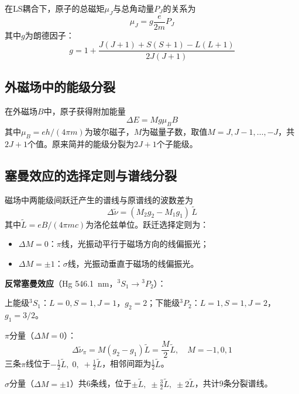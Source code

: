 \documentclass[a4paper,8pt,twocolumn]{article}
\begin{document}
在LS耦合下，原子的总磁矩$\mu_J$与总角动量$P_J$的关系为
\begin{equation}
  \mu_J = g\frac{e}{2m}P_J
  \tag{1}
\end{equation}
其中$g$为朗德因子：
\begin{equation}
  g = 1 + \frac{J(J+1)+S(S+1)-L(L+1)}{2J(J+1)}
  \tag{2}
\end{equation}

\subsection{外磁场中的能级分裂}

在外磁场$B$中，原子获得附加能量
\begin{equation}
  \Delta E = Mg\mu_B B
  \tag{3}
\end{equation}
其中$\mu_B = eh/(4\pi m)$为玻尔磁子，$M$为磁量子数，取值$M = J, J-1, \ldots, -J$，共$2J+1$个值。原来简并的能级分裂为$2J+1$个子能级。

\subsection{塞曼效应的选择定则与谱线分裂}

磁场中两能级间跃迁产生的谱线与原谱线的波数差为
\begin{equation}
  \Delta\tilde{\nu} = (M_2 g_2 - M_1 g_1)\,\tilde{L}
  \tag{4}
\end{equation}
其中$\tilde{L} = eB/(4\pi mc)$为洛伦兹单位。跃迁选择定则为：
\begin{itemize}
  \item $\Delta M = 0$：$\pi$线，光振动平行于磁场方向的线偏振光；
  \item $\Delta M = \pm 1$：$\sigma$线，光振动垂直于磁场的线偏振光。
\end{itemize}

\textbf{反常塞曼效应}（Hg \SI{546.1}{nm}，${}^3S_1 \to {}^3P_2$）：

上能级${}^3S_1$：$L=0, S=1, J=1$，$g_2 = 2$；下能级${}^3P_2$：$L=1, S=1, J=2$，$g_1 = 3/2$。

$\pi$分量（$\Delta M = 0$）：
\begin{equation}
  \Delta\tilde{\nu}_\pi = M(g_2 - g_1)\tilde{L} = \frac{M}{2}\tilde{L},\quad M = -1,0,1
  \tag{5}
\end{equation}
三条$\pi$线位于$-\frac{1}{2}\tilde{L},\; 0,\; +\frac{1}{2}\tilde{L}$，相邻间距为$\frac{1}{2}\tilde{L}$。

$\sigma$分量（$\Delta M = \pm 1$）共6条线，位于$\pm\tilde{L},\; \pm\frac{3}{2}\tilde{L},\; \pm 2\tilde{L}$，共计9条分裂谱线。
\end{document}
